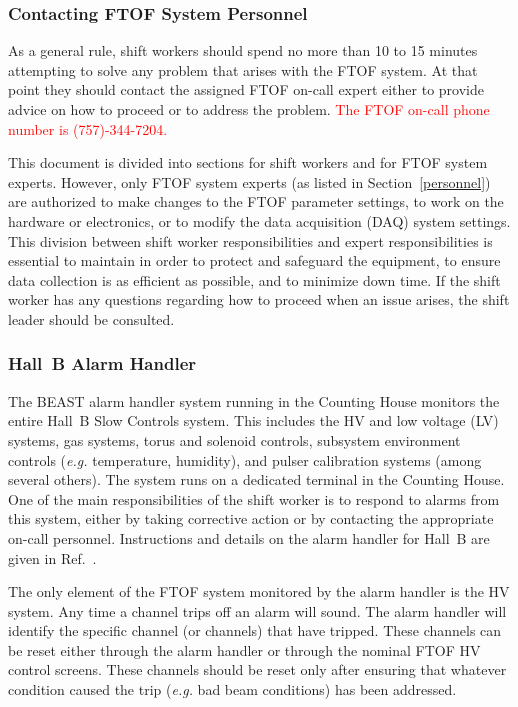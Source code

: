 \documentclass[12pt]{article}
\begin{document}
\subsubsection{Contacting FTOF System Personnel}
\label{contact}

As a general rule, shift workers should spend no more than 10 to 15 minutes attempting to 
solve any problem that arises with the FTOF system. At that point they should contact the 
assigned FTOF on-call expert either to provide advice on how to proceed or to address the 
problem. \textcolor{red}{The FTOF on-call phone number is (757)-344-7204.}

This document is divided into sections for shift workers and for FTOF system experts. 
However, only FTOF system experts (as listed in Section~\ref{personnel}) are authorized 
to make changes to the FTOF parameter settings, to work on the hardware or electronics, 
or to modify the data acquisition (DAQ) system settings. This division between shift worker
responsibilities and expert responsibilities is essential to maintain in order to protect
and safeguard the equipment, to ensure data collection is as efficient as possible, and to
minimize down time. If the shift worker has any questions regarding how to proceed when an
issue arises, the shift leader should be consulted.

\subsubsection{Hall~B Alarm Handler}
\label{alarms}

The BEAST alarm handler system running in the Counting House monitors the entire 
Hall~B Slow Controls system. This includes the HV and low voltage (LV) systems, gas 
systems, torus and solenoid controls, subsystem environment controls ({\it e.g.}
temperature, humidity), and pulser calibration systems (among several others). The system
runs on a dedicated terminal in the Counting House. One of the main responsibilities of the
shift worker is to respond to alarms from this system, either by taking corrective action
or by contacting the appropriate on-call personnel. Instructions and details on the alarm 
handler for Hall~B are given in Ref.~\cite{beast}.

The only element of the FTOF system monitored by the alarm handler is the HV system. 
Any time a channel trips off an alarm will sound. The alarm handler will identify the 
specific channel (or channels) that have tripped. These channels can be reset either 
through the alarm handler or through the nominal FTOF HV control screens. These channels 
should be reset only after ensuring that whatever condition caused the trip ({\it e.g.}
bad beam conditions) has been addressed.
\end{document}
